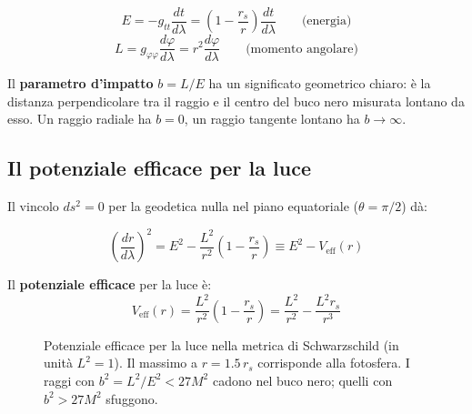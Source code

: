 \documentclass[12pt, a4paper, twoside]{article}
\theoremstyle{definition}
\newcommand{\RS}{r_{\!s}}          %
\begin{document}
\begin{equation}
  E = -g_{tt}\frac{dt}{d\lambda} = \left(1 - \frac{\RS}{r}\right)\frac{dt}{d\lambda}
  \qquad \text{(energia)}
\end{equation}
\begin{equation}
  L = g_{\varphi\varphi}\frac{d\varphi}{d\lambda} = r^2\frac{d\varphi}{d\lambda}
  \qquad \text{(momento angolare)}
\end{equation}

Il \textbf{parametro d'impatto} $b = L/E$ ha un significato geometrico chiaro:
è la distanza perpendicolare tra il raggio e il centro del buco nero misurata
lontano da esso. Un raggio radiale ha $b = 0$, un raggio tangente lontano ha
$b \to \infty$.

\subsection{Il potenziale efficace per la luce}

Il vincolo $ds^2 = 0$ per la geodetica nulla nel piano equatoriale
($\theta = \pi/2$) dà:

\begin{equation}
  \left(\frac{dr}{d\lambda}\right)^2 = E^2 - \frac{L^2}{r^2}\left(1 - \frac{\RS}{r}\right)
  \equiv E^2 - V_{\text{eff}}(r)
\end{equation}

Il \textbf{potenziale efficace} per la luce è:
\begin{equation}
  V_{\text{eff}}(r) = \frac{L^2}{r^2}\left(1 - \frac{\RS}{r}\right)
  = \frac{L^2}{r^2} - \frac{L^2 \RS}{r^3}
  \label{eq:veff}
\end{equation}

\begin{figure}[h!]
  \centering
  \caption{Potenziale efficace per la luce nella metrica di Schwarzschild
           (in unità $L^2 = 1$). Il massimo a $r = 1.5\,\RS$ corrisponde
           alla fotosfera. I raggi con $b^2 = L^2/E^2 < 27M^2$ cadono
           nel buco nero; quelli con $b^2 > 27M^2$ sfuggono.}
\end{figure}
\end{document}
